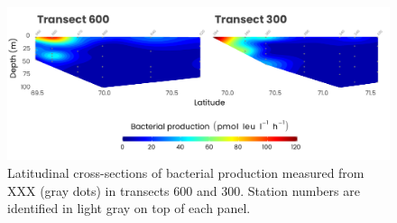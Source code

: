 \documentclass[essd, manuscript]{copernicus}
\begin{document}
\clearpage

\begin{figure}[H]
	\centering
	\includegraphics[scale = 1]{../../../graphs/fig11.pdf}
	\caption{Latitudinal cross-sections of bacterial production measured from XXX (gray dots) in transects 600 and 300. Station numbers are identified in light gray on top of each panel.}
\end{figure}



\appendix


\noappendix       %




\appendixfigures  %

\appendixtables   %
\end{document}
